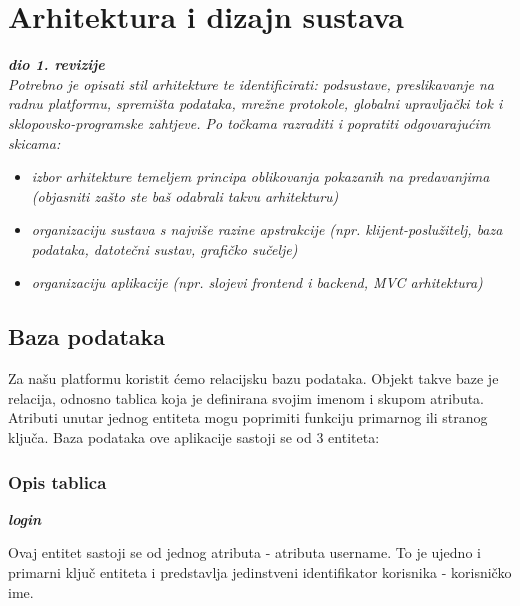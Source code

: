 \chapter{Arhitektura i dizajn sustava}
		
		\textbf{\textit{dio 1. revizije}}\\

		\textit{ Potrebno je opisati stil arhitekture te identificirati: podsustave, preslikavanje na radnu platformu, spremišta podataka, mrežne protokole, globalni upravljački tok i sklopovsko-programske zahtjeve. Po točkama razraditi i popratiti odgovarajućim skicama:}
	\begin{itemize}
		\item 	\textit{izbor arhitekture temeljem principa oblikovanja pokazanih na predavanjima (objasniti zašto ste baš odabrali takvu arhitekturu)}
		\item 	\textit{organizaciju sustava s najviše razine apstrakcije (npr. klijent-poslužitelj, baza podataka, datotečni sustav, grafičko sučelje)}
		\item 	\textit{organizaciju aplikacije (npr. slojevi frontend i backend, MVC arhitektura) }		
	\end{itemize}

	
		

		

				
		\section{Baza podataka}
			
		Za našu platformu koristit ćemo relacijsku bazu podataka. Objekt takve baze je relacija, odnosno tablica koja je definirana svojim imenom i skupom atributa. Atributi unutar jednog entiteta mogu poprimiti funkciju primarnog ili stranog ključa.
Baza podataka ove aplikacije sastoji se od 3 entiteta:
		
			\subsection{Opis tablica}
			
\textbf{\textit{login}}\\
\begin{samepage}
Ovaj entitet sastoji se od jednog atributa - atributa username. To je ujedno i primarni ključ entiteta i predstavlja jedinstveni identifikator korisnika - korisničko ime.
\end{samepage}
				
